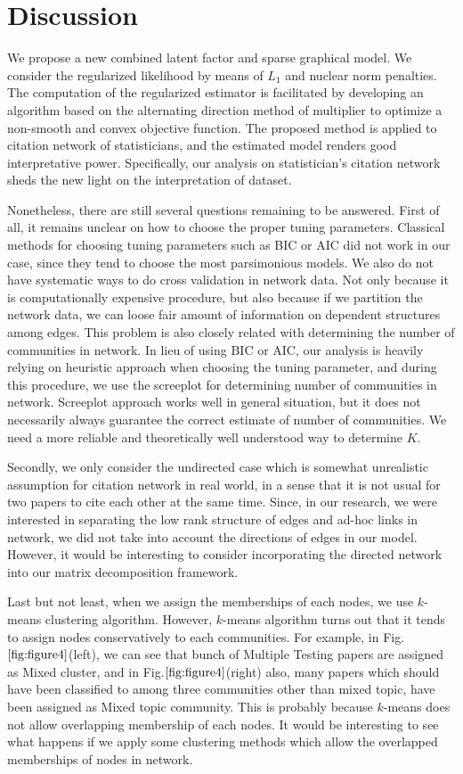 \documentclass[AMS,STIX1COL]{WileyNJD-v2}
\begin{document}
{\section{Discussion}
\label{sec:Con}

We propose a new combined latent factor and sparse graphical model.
We consider the regularized likelihood by means of $L_1$ and nuclear norm penalties.
The computation of the regularized estimator is facilitated by developing an algorithm based on the alternating direction method of multiplier to optimize a non-smooth and convex objective function.
The proposed method is applied to citation network of statisticians, and the estimated model renders good interpretative power.
Specifically, our analysis on statistician's citation network sheds the new light on the interpretation of dataset.

Nonetheless, there are still several questions remaining to be answered.
First of all, it remains unclear on how to choose the proper tuning parameters.
Classical methods for choosing tuning parameters such as BIC or AIC did not work in our case, since they tend to choose the most parsimonious models.
We also do not have systematic ways to do cross validation in network data.
Not only because it is computationally expensive procedure, but also because if we partition the network data, we can loose fair amount of information on dependent structures among edges.
This problem is also closely related with determining the number of communities in network.
In lieu of using BIC or AIC, our analysis is heavily relying on heuristic approach when choosing the tuning parameter, and during this procedure, we use the screeplot for determining number of communities in network.
Screeplot approach works well in general situation, but it does not necessarily always guarantee the correct estimate of number of communities.
We need a more reliable and theoretically well understood way to determine $K$.

Secondly, we only consider the undirected case which is somewhat unrealistic assumption for citation network in real world, in a sense that it is not usual for two papers to cite each other at the same time.
Since, in our research, we were interested in separating the low rank structure of edges and ad-hoc links in network, we did not take into account the directions of edges in our model.
However, it would be interesting to consider incorporating the directed network into our matrix decomposition framework.

Last but not least, when we assign the memberships of each nodes, we use $k$-means clustering algorithm.
However, $k$-means algorithm turns out that it tends to assign nodes conservatively to each communities.
For example, in Fig.$\ref{fig:figure4}$(left), we can see that bunch of Multiple Testing papers are assigned as Mixed cluster, and in Fig.$\ref{fig:figure4}$(right) also, many papers which should have been classified to among three communities other than mixed topic, have been assigned as Mixed topic community.
This is probably because $k$-means does not allow overlapping membership of each nodes.
It would be interesting to see what happens if we apply some clustering methods which allow the overlapped memberships of nodes in network.

}
\end{document}
